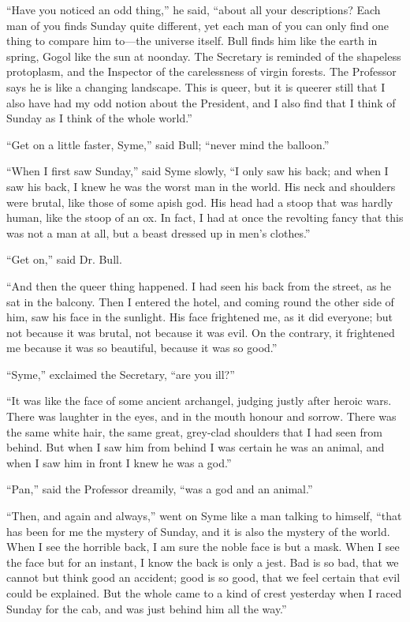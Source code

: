 “Have you noticed an odd thing,” he said, “about all your descriptions? Each man of you finds Sunday quite different, yet each man of you can only find one thing to compare him to⁠—the universe itself. Bull finds him like the earth in spring, Gogol like the sun at noonday. The Secretary is reminded of the shapeless protoplasm, and the Inspector of the carelessness of virgin forests. The Professor says he is like a changing landscape. This is queer, but it is queerer still that I also have had my odd notion about the President, and I also find that I think of Sunday as I think of the whole world.”

“Get on a little faster, Syme,” said Bull; “never mind the balloon.”

“When I first saw Sunday,” said Syme slowly, “I only saw his back; and when I saw his back, I knew he was the worst man in the world. His neck and shoulders were brutal, like those of some apish god. His head had a stoop that was hardly human, like the stoop of an ox. In fact, I had at once the revolting fancy that this was not a man at all, but a beast dressed up in men’s clothes.”

“Get on,” said Dr. Bull.

“And then the queer thing happened. I had seen his back from the street, as he sat in the balcony. Then I entered the hotel, and coming round the other side of him, saw his face in the sunlight. His face frightened me, as it did everyone; but not because it was brutal, not because it was evil. On the contrary, it frightened me because it was so beautiful, because it was so good.”

“Syme,” exclaimed the Secretary, “are you ill?”

“It was like the face of some ancient archangel, judging justly after heroic wars. There was laughter in the eyes, and in the mouth honour and sorrow. There was the same white hair, the same great, grey-clad shoulders that I had seen from behind. But when I saw him from behind I was certain he was an animal, and when I saw him in front I knew he was a god.”

“Pan,” said the Professor dreamily, “was a god and an animal.”

“Then, and again and always,” went on Syme like a man talking to himself, “that has been for me the mystery of Sunday, and it is also the mystery of the world. When I see the horrible back, I am sure the noble face is but a mask. When I see the face but for an instant, I know the back is only a jest. Bad is so bad, that we cannot but think good an accident; good is so good, that we feel certain that evil could be explained. But the whole came to a kind of crest yesterday when I raced Sunday for the cab, and was just behind him all the way.”

